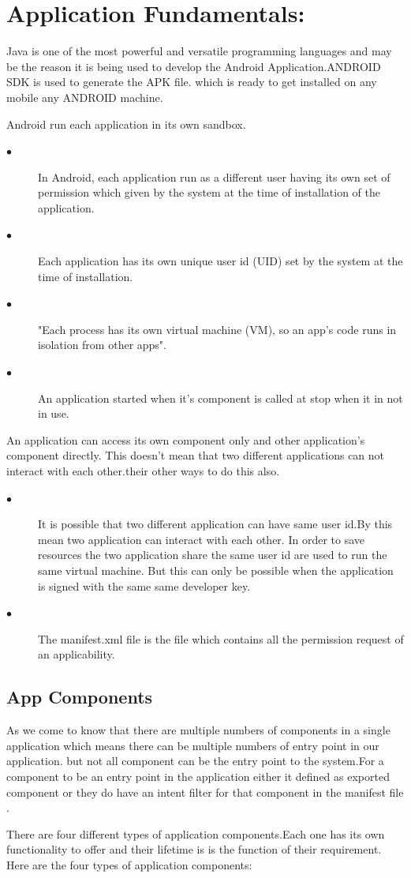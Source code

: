 \documentclass[11pt]{report}
\begin{document}
\section{Application Fundamentals:}
Java is one of the most powerful and versatile programming languages and may be the reason it is being used to develop the Android Application.ANDROID 
SDK is used to generate the APK file. which is ready to get installed on any mobile any ANDROID machine.
\par
Android run each application in its own sandbox. 
\begin{description}
 \item[$\bullet$]In Android, each application run as a different user having its own set of permission which given by the system at the time of installation of the application.  
 \item[$\bullet$]Each application has its own unique user id (UID) set by the system at the time of installation.
  \item[$\bullet$]"Each process has its own virtual machine (VM), so an app's code runs in isolation from other apps".\cite{fun}
 \item[$\bullet$] An application started when it's component is called at stop when it in not in use.

\end{description}
\par
An application can access its own component only and other application's component directly.
This doesn't mean that two different applications can not interact with each other.their other ways to do this also.
\begin{description}
 \item[$\bullet$] It is possible that two different application can have same user id.By this mean two application can interact with each other.
 In order to save resources the two application share the same user id are used to run the same virtual machine.
 But this can only be possible when the application is signed with the same same developer key.
 
 \item[$\bullet$]The manifest.xml file is the file which contains all the permission request of an applicability.

\end{description}
\subsection{App Components}
As we come to know that there are multiple numbers of components in a single application which means there can be multiple numbers of entry point in our application. 
but not all component can be the entry point to the system.For a component to be an entry point in the application either it defined as exported component or they do have an intent filter for that component in the 
manifest file .
\par
There are four different types of application components.Each one has its own functionality to offer and their lifetime is is the function of their requirement.
\linebreak
Here are the four types of application components:
\end{document}
